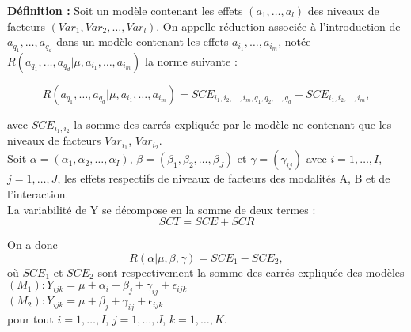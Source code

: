 \documentclass[12pt,a4paper]{report}
\begin{document}
	\textbf{Définition :} Soit un modèle contenant les effets $(a_1,\ldots,a_l)$ des niveaux de facteurs $(Var_1, Var_2, \ldots, Var_l)$. On appelle réduction associée à l'introduction de $a_{q_1}, \ldots, a_{q_d}$ dans un modèle contenant les effets $a_{i_1}, \ldots, a_{i_m}$, notée $R(a_{q_1}, \ldots, a_{q_d}|\mu,a_{i_1}, \ldots, a_{i_m})$ la norme suivante : 
	
	\begin{equation}
		R(a_{q_1}, \ldots, a_{q_d}|\mu,a_{i_1}, \ldots, a_{i_m}) = SCE_{i_1,i_2,\ldots,i_m,q_1,q_2,\ldots,q_d} - SCE_{i_1,i_2,\ldots,i_m},
	\end{equation}
	
	avec $SCE_{i_1,i_2}$ la somme des carrés expliquée par le modèle ne contenant que les niveaux de facteurs $Var_{i_1}$, $Var_{i_2}$.\\
	
	Soit $\alpha = (\alpha_1,\alpha_2,\ldots,\alpha_I)$, $\beta = (\beta_1,\beta_2,\ldots,\beta_J)$ et $\gamma = (\gamma_{ij})$ avec $i = 1,\ldots,I$, $j = 1,\ldots,J$, les effets respectifs de niveaux de facteurs des modalités A, B et de l'interaction.\\
	
	La variabilité de Y se décompose en la somme de deux termes : 
	\begin{equation}
		SCT = SCE + SCR
	\end{equation}
	
	On a donc
	\begin{equation}
		R(\alpha|\mu,\beta,\gamma) = SCE_1 - SCE_2,
	\end{equation}
	où $SCE_1$ et $SCE_2$ sont respectivement la somme des carrés expliquée des modèles\\
	$(M_1) : Y_{ijk} = \mu + \alpha_i + \beta_j + \gamma_{ij} + \epsilon_{ijk}$\\
	$(M_2) : Y_{ijk} = \mu + \beta_j + \gamma_{ij} + \epsilon_{ijk}$\\
	pour tout $i = 1,\ldots,I$, $j = 1,\ldots,J$, $k = 1,\ldots,K$.\\
	
\end{document}
